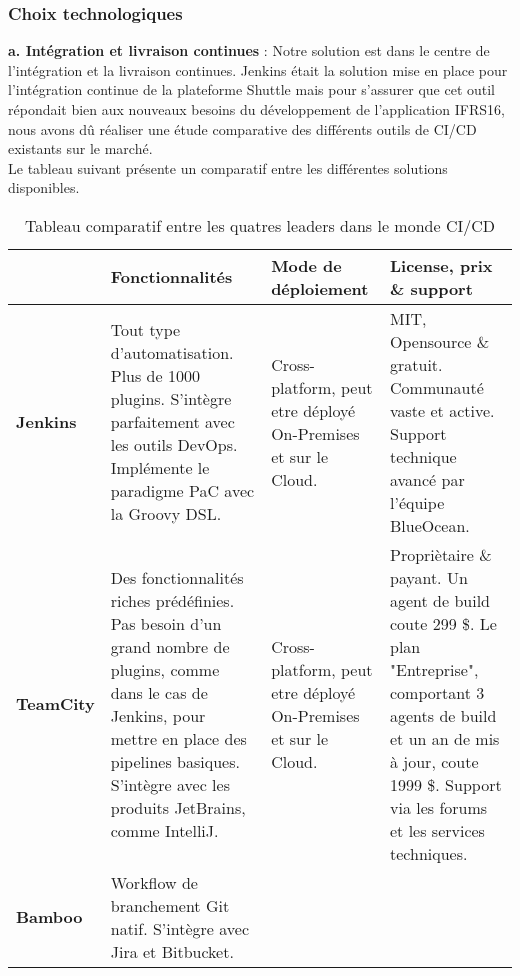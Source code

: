 \begin{spacing}{1.2}
\subsubsection{Choix technologiques}
\textbf{a. Intégration et livraison continues} :
Notre solution est dans le centre de l'intégration et la livraison continues. Jenkins était la solution mise en place pour l'intégration continue de la plateforme Shuttle mais pour s'assurer que cet outil répondait bien aux nouveaux besoins du développement de l'application IFRS16, nous avons dû réaliser une étude comparative des différents outils de CI/CD existants sur le marché. \\
Le tableau suivant présente un comparatif entre les différentes solutions disponibles. 
\FloatBarrier
\begin{table}[ht]
	\centering
	\caption{Tableau comparatif entre les quatres leaders dans le monde CI/CD}
	\footnotesize
	\begin{tabularx}{\textwidth}{|p{1.4cm}|X|X|X|}
          \hline
          & 
          {\textbf{Fonctionnalités}}
          &
          {\textbf{Mode de déploiement}}
          &
          {\textbf{License, prix \& support}}
          \\
          \hline
          \textbf{Jenkins}
          &
          Tout type d'automatisation.
          Plus de 1000 plugins.
          S'intègre parfaitement avec les outils DevOps.
          Implémente le paradigme PaC avec la Groovy DSL.
          &
          Cross-platform, peut etre déployé On-Premises et sur le Cloud.
          &
          MIT, Opensource \& gratuit.
          Communauté vaste et active.
          Support technique avancé par l'équipe BlueOcean. 
          \\
          \hline
          \textbf{TeamCity}
          &
          Des fonctionnalités riches prédéfinies. 
          Pas besoin d'un grand nombre de plugins, comme dans le cas de Jenkins, pour mettre en place des pipelines basiques. 
          S'intègre avec les produits JetBrains, comme IntelliJ.
          &
          Cross-platform, peut etre déployé On-Premises et sur le Cloud.
          &
          Propriètaire \& payant.
          Un agent de build coute 299 \$. Le plan "Entreprise", comportant 3 agents de build et un an de mis à jour, coute 1999 \$. 
          Support via les forums et les services techniques. 
          \\
          \hline
          \textbf{Bamboo}
          &
          Workflow de branchement Git natif. 
          S'intègre avec Jira et Bitbucket.

\end{tabularx}
\end{table}
\end{spacing}
